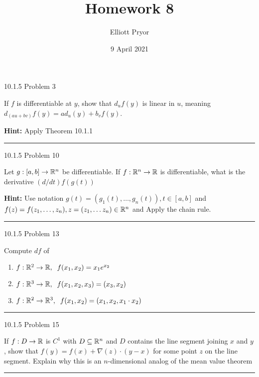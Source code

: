 \documentclass[11pt]{article}
\title{Homework 8}
\author{Elliott Pryor}
\date{9 April 2021}
\begin{document}
\maketitle

 10.1.5 Problem 3

If $f$ is differentiable at $y$, show that $d_uf(y)$ is linear in $u$,
meaning $d_{(au + bv)}f(y) = a d_u(y) + b_v f(y)$.

\textbf{Hint:} Apply Theorem 10.1.1

\hrule






 10.1.5 Problem 10

Let $g : [a,b] \to \mathbb{R}^n$ be differentiable. If $f : \mathbb{R}^n \to \mathbb{R}$ is differentiable,
what is the derivative $(d/dt)f(g(t))$

\textbf{Hint:} Use notation $g(t) = (g_1(t), \dots, g_n(t)), t \in [a,b]$
and $f(z) = f(z_1, \dots, z_n), z = (z_1, \dots z_n) \in \mathbb{R}^n$ and Apply
the chain rule.

\hrule









 10.1.5 Problem 13

Compute $df$ of 
\begin{enumerate}
    \item $f: \mathbb{R}^2 \to \mathbb{R}, \; \; f(x_1, x_2) = x_1 e^{x_2}$
    \item $f: \mathbb{R}^3 \to \mathbb{R}, \; \; f(x_1, x_2, x_3) = (x_3, x_2)$
    \item $f: \mathbb{R}^2 \to \mathbb{R}^3, \; \; f(x_1, x_2) = (x_1, x_2, x_1\cdot x_2)$
\end{enumerate}

\hrule







 10.1.5 Problem 15

If $f: D \to \mathbb{R}$ is $C^1$ with $D \subseteq \mathbb{R}^n$ and $D$ contains the line segment
joining $x$ and $y$, show that $f(y) = f(x) +  \nabla(z) \cdot (y - x)$ for some
point $z$ on the line segment. Explain why this is an $n$-dimensional
analog of the mean value theorem

\hrule
\end{document}

